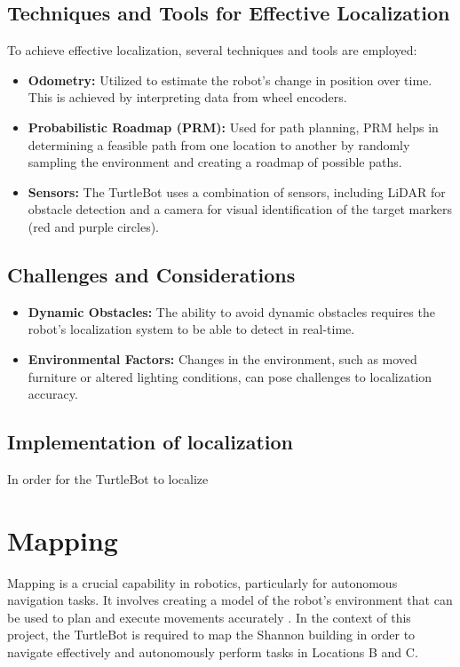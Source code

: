 \documentclass{article}
\begin{document}
	\subsection{Techniques and Tools for Effective Localization}
	To achieve effective localization, several techniques and tools are employed:
	\begin{itemize}
		\item \textbf{Odometry:} Utilized to estimate the robot's change in position over time. This is achieved by interpreting data from wheel encoders.
		\item \textbf{Probabilistic Roadmap (PRM):} Used for path planning, PRM helps in determining a feasible path from one location to another by randomly sampling the environment and creating a roadmap of possible paths.
		\item \textbf{Sensors:} The TurtleBot uses a combination of sensors, including LiDAR for obstacle detection and a camera for visual identification of the target markers (red and purple circles).
	\end{itemize}
	\subsection{Challenges and Considerations}
	\begin{itemize}
		\item \textbf{Dynamic Obstacles:} The ability to avoid dynamic obstacles requires the robot's localization system to be able to detect in real-time.
		\item \textbf{Environmental Factors:} Changes in the environment, such as moved furniture or altered lighting conditions, can pose challenges to localization accuracy.
	\end{itemize}
	\subsection{Implementation of localization}
	In order  for the TurtleBot to localize 
	\clearpage
	\section{Mapping}
	Mapping is a crucial capability in robotics, particularly for autonomous navigation tasks. It involves creating a model of the robot's environment that can be used to plan and execute movements accurately \cite{corke2017}. In the context of this project, the TurtleBot is required to map the Shannon building in order to navigate effectively and autonomously perform tasks in Locations B and C.
	
\end{document}
